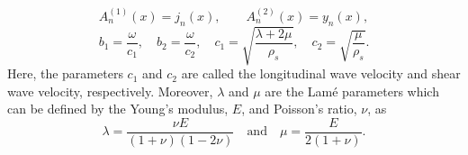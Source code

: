 \begin{equation*}
	A_{n}^{(1)}(x) = j_n(x),\qquad A_{n}^{(2)}(x) = y_n(x),
\end{equation*}
\begin{equation*}
	b_1=\frac{\omega}{c_1},\quad b_2=\frac{\omega}{c_2},\quad c_1 = \sqrt{\frac{\lambda+2\mu}{\rho_s}},\quad c_2 = \sqrt{\frac{\mu}{\rho_s}}.
\end{equation*}
Here, the parameters $c_1$ and $c_2$ are called the longitudinal wave velocity and shear wave velocity, respectively. Moreover, $\lambda$ and $\mu$ are the Lam{\'e} parameters which can be defined by the Young's modulus, $E$, and Poisson's ratio, $\nu$, as
\begin{equation*}
	\lambda = \frac{\nu E}{(1+\nu)(1-2\nu)}\quad\text{and}\quad \mu = \frac{E}{2(1+\nu)}.
\end{equation*}